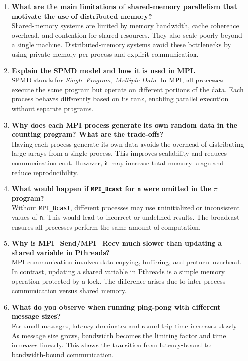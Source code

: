 \documentclass[12pt,a4paper]{article}
\begin{document}
\begin{enumerate}

\item \textbf{What are the main limitations of shared-memory parallelism that motivate the use of distributed memory?} \\
Shared-memory systems are limited by memory bandwidth, cache coherence
overhead, and contention for shared resources.
They also scale poorly beyond a single machine.
Distributed-memory systems avoid these bottlenecks by using private memory
per process and explicit communication.

\item \textbf{Explain the SPMD model and how it is used in MPI.} \\
SPMD stands for \emph{Single Program, Multiple Data}.
In MPI, all processes execute the same program but operate on different
portions of the data.
Each process behaves differently based on its rank, enabling parallel
execution without separate programs.

\item \textbf{Why does each MPI process generate its own random data in the counting program? What are the trade-offs?} \\
Having each process generate its own data avoids the overhead of distributing
large arrays from a single process.
This improves scalability and reduces communication cost.
However, it may increase total memory usage and reduce reproducibility.

\item \textbf{What would happen if \texttt{MPI\_Bcast} for \texttt{n} were omitted in the $\pi$ program?} \\
Without \texttt{MPI\_Bcast}, different processes may use uninitialized or
inconsistent values of \texttt{n}.
This would lead to incorrect or undefined results.
The broadcast ensures all processes perform the same amount of computation.

\item \textbf{Why is MPI\_Send/MPI\_Recv much slower than updating a shared variable in Pthreads?} \\
MPI communication involves data copying, buffering, and protocol overhead.
In contrast, updating a shared variable in Pthreads is a simple memory
operation protected by a lock.
The difference arises due to inter-process communication versus shared memory.

\item \textbf{What do you observe when running ping-pong with different message sizes?} \\
For small messages, latency dominates and round-trip time increases slowly.
As message size grows, bandwidth becomes the limiting factor and time
increases linearly.
This shows the transition from latency-bound to bandwidth-bound communication.


\end{enumerate}
\end{document}
